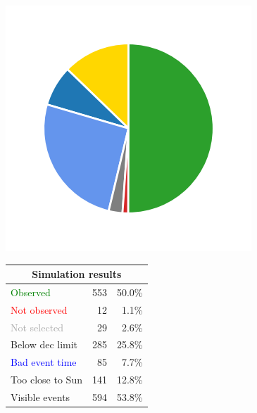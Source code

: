 \begin{colsection}
\begin{colsection}
\begin{figure}[p]
\begin{center}
\begin{minipage}[t]{0.2\textwidth}\vspace{10pt}
\includegraphics[width=\linewidth]{images/gw_sims/1n8_pie.png}
\end{minipage}
%
\begin{minipage}[t]{0.37\textwidth}\vspace{0pt}
\begin{tabular}{lrr}
\multicolumn{3}{c}{\textbf{Simulation results}} \\
\midrule
\textcolor{Green}{Observed} & 553 & 50.0\% \\
\textcolor{Red}{Not observed} & 12 & 1.1\% \\
\textcolor{darkgray}{Not selected} & 29 & 2.6\% \\
\textcolor{NavyBlue}{Below dec limit} & 285 & 25.8\% \\
\textcolor{Blue}{Bad event time} & 85 & 7.7\% \\
\textcolor{BurntOrange}{Too close to Sun} & 141 & 12.8\% \\
\midrule
Visible events & 594 &  53.8\% \\
\end{tabular}
\end{minipage}
%
\begin{minipage}[t]{0.35\textwidth}\vspace{0pt}

\end{minipage}
\end{center}
\end{figure}
\end{colsection}
\end{colsection}
